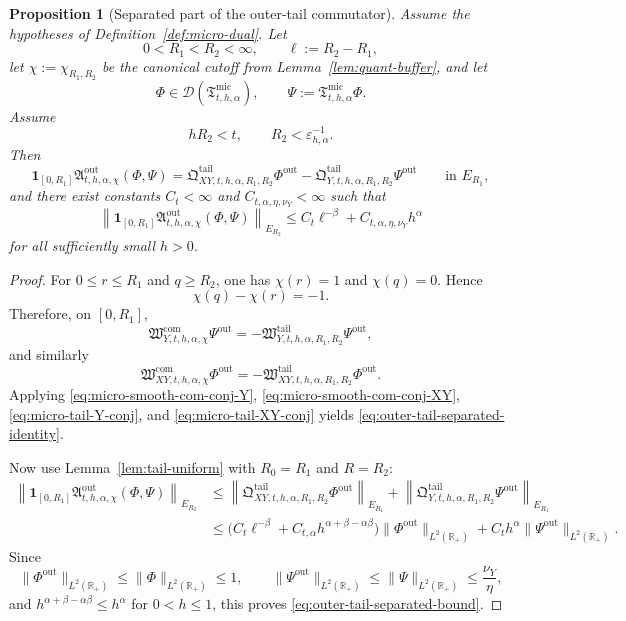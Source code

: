 \documentclass[11pt,a4paper]{amsart}
\theoremstyle{plain}
\newtheorem{proposition}[theorem]{Proposition}
\theoremstyle{definition}
\theoremstyle{remark}
\newcommand{\R}{\mathbb{R}}
\newcommand{\one}{\mathbf 1}
\begin{document}
\begin{proposition}[Separated part of the outer-tail commutator]
\label{prop:outer-tail-separated}
Assume the hypotheses of Definition~\ref{def:micro-dual}. Let
\[
0<R_1<R_2<\infty,
\qquad
\ell:=R_2-R_1,
\]
let \(\chi:=\chi_{R_1,R_2}\) be the canonical cutoff from Lemma~\ref{lem:quant-buffer}, and let
\[
\Phi\in\mathcal D(\mathfrak T_{t,h,\alpha}^{\mathrm{mic}}),
\qquad
\Psi:=\mathfrak T_{t,h,\alpha}^{\mathrm{mic}}\Phi.
\]
Assume
\[
hR_2<t,
\qquad
R_2<\varepsilon_{h,\alpha}^{-1}.
\]
Then
\begin{equation}\label{eq:outer-tail-separated-identity}
\one_{[0,R_1]}\mathfrak A_{t,h,\alpha,\chi}^{\mathrm{out}}(\Phi,\Psi)
=
\mathfrak Q_{XY,t,h,\alpha,R_1,R_2}^{\mathrm{tail}}\Phi^{\mathrm{out}}
-
\mathfrak Q_{Y,t,h,\alpha,R_1,R_2}^{\mathrm{tail}}\Psi^{\mathrm{out}}
\qquad\text{in }E_{R_1},
\end{equation}
and there exist constants \(C_t<\infty\) and \(C_{t,\alpha,\eta,\nu_Y}<\infty\) such that
\begin{equation}\label{eq:outer-tail-separated-bound}
\left\|
\one_{[0,R_1]}\mathfrak A_{t,h,\alpha,\chi}^{\mathrm{out}}(\Phi,\Psi)
\right\|_{E_{R_2}}
\le
C_t\ell^{-\beta}
+
C_{t,\alpha,\eta,\nu_Y}h^\alpha
\end{equation}
for all sufficiently small \(h>0\).
\end{proposition}

\begin{proof}
For \(0\le r\le R_1\) and \(q\ge R_2\), one has \(\chi(r)=1\) and \(\chi(q)=0\). Hence
\[
\chi(q)-\chi(r)=-1.
\]
Therefore, on \([0,R_1]\),
\[
\mathfrak W_{Y,t,h,\alpha,\chi}^{\mathrm{com}}\Psi^{\mathrm{out}}
=
-\mathfrak W_{Y,t,h,\alpha,R_1,R_2}^{\mathrm{tail}}\Psi^{\mathrm{out}},
\]
and similarly
\[
\mathfrak W_{XY,t,h,\alpha,\chi}^{\mathrm{com}}\Phi^{\mathrm{out}}
=
-\mathfrak W_{XY,t,h,\alpha,R_1,R_2}^{\mathrm{tail}}\Phi^{\mathrm{out}}.
\]
Applying \eqref{eq:micro-smooth-com-conj-Y}, \eqref{eq:micro-smooth-com-conj-XY},
\eqref{eq:micro-tail-Y-conj}, and \eqref{eq:micro-tail-XY-conj} yields
\eqref{eq:outer-tail-separated-identity}.

Now use Lemma~\ref{lem:tail-uniform} with \(R_0=R_1\) and \(R=R_2\):
\begin{align*}
\left\|
\one_{[0,R_1]}\mathfrak A_{t,h,\alpha,\chi}^{\mathrm{out}}(\Phi,\Psi)
\right\|_{E_{R_2}}
&\le
\left\|
\mathfrak Q_{XY,t,h,\alpha,R_1,R_2}^{\mathrm{tail}}\Phi^{\mathrm{out}}
\right\|_{E_{R_1}}
+
\left\|
\mathfrak Q_{Y,t,h,\alpha,R_1,R_2}^{\mathrm{tail}}\Psi^{\mathrm{out}}
\right\|_{E_{R_1}}\\
&\le
\bigl(
C_t\ell^{-\beta}
+
C_{t,\alpha}h^{\alpha+\beta-\alpha\beta}
\bigr)\|\Phi^{\mathrm{out}}\|_{L^2(\R_+)}
+
C_th^\alpha\|\Psi^{\mathrm{out}}\|_{L^2(\R_+)}.
\end{align*}
Since
\[
\|\Phi^{\mathrm{out}}\|_{L^2(\R_+)}
\le
\|\Phi\|_{L^2(\R_+)}
\le
1,
\qquad
\|\Psi^{\mathrm{out}}\|_{L^2(\R_+)}
\le
\|\Psi\|_{L^2(\R_+)}
\le
\frac{\nu_Y}{\eta},
\]
and \(h^{\alpha+\beta-\alpha\beta}\le h^\alpha\) for \(0<h\le1\), this proves
\eqref{eq:outer-tail-separated-bound}.
\end{proof}
\end{document}
